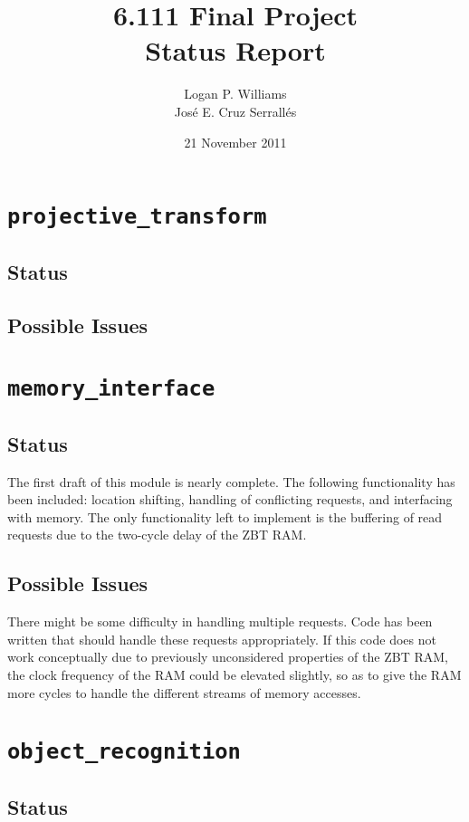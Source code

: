 \documentclass{article}
\title{6.111 Final Project\\Status Report}
\author{Logan P. Williams\\Jos\'{e} E. Cruz Serrall\'{e}s}
\date{21 November 2011}
\begin{document}
\maketitle


\section{{\tt projective\_transform}}
\subsection{Status} 
\subsection{Possible Issues}

\section{{\tt memory\_interface}}
\subsection{Status} The first draft of this module is nearly complete. The following functionality has been included: location shifting, handling of conflicting requests, and interfacing with memory. The only functionality left to implement is the buffering of read requests due to the two-cycle delay of the ZBT RAM. 
\subsection{Possible Issues} There might be some difficulty in handling multiple requests. Code has been written that should handle these requests appropriately. If this code does not work conceptually due to previously unconsidered properties of the ZBT RAM, the clock frequency of the RAM could be elevated slightly, so as to give the RAM more cycles to handle the different streams of memory accesses.

\section{{\tt object\_recognition}}
\subsection{Status} 
\end{document}
